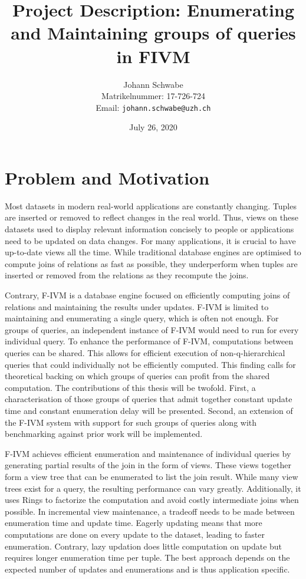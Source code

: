 \documentclass[abstracton,12pt]{scrreprt}
\title{Project Description: Enumerating and Maintaining groups of queries in FIVM}
\author{
	Johann Schwabe\\[-5pt]
	\scriptsize Matrikelnummer: 17-726-724\\[-5pt]
	\scriptsize Email: \texttt{johann.schwabe@uzh.ch}
}
\date{\vspace*{2cm}July 26, 2020}
\begin{document}
\maketitle



\chapter{Problem and Motivation}
Most datasets in modern real-world applications are constantly changing. Tuples are inserted or removed to reflect changes in the real world. Thus, views on these datasets used to display relevant information concisely to people or applications need to be updated on data changes. For many applications, it is crucial to have up-to-date views all the time. While traditional database engines are optimised to compute joins of relations as fast as possible, they underperform when tuples are inserted or removed from the relations as they recompute the joins. 

Contrary, F-IVM is a database engine focused on efficiently computing joins of relations and maintaining the results under updates. F-IVM is limited to maintaining and enumerating a single query, which is often not enough. For groups of queries, an independent instance of F-IVM would need to run for every individual query. To enhance the performance of F-IVM, computations between queries can be shared. This allows for efficient execution of non-q-hierarchical queries that could individually not be efficiently computed. This finding calls for theoretical backing on which groups of queries can profit from the shared computation. The contributions of this thesis will be twofold. First, a characterisation of those groups of queries that admit together constant update time and constant enumeration delay will be presented. Second, an extension of the F-IVM system with support for such groups of queries along with benchmarking against prior work will be implemented.

 F-IVM achieves efficient enumeration and maintenance of individual queries by generating partial results of the join in the form of views. These views together form a view tree that can be enumerated to list the join result. While many view trees exist for a query, the resulting performance can vary greatly. Additionally, it uses Rings to factorize the computation and avoid costly intermediate joins when possible. In incremental view maintenance, a tradeoff needs to be made between enumeration time and update time. Eagerly updating means that more computations are done on every update to the dataset, leading to faster enumeration. Contrary, lazy updation does little computation on update but requires longer enumeration time per tuple. The best approach depends on the expected number of updates and enumerations and is thus application specific. 
 
\end{document}

